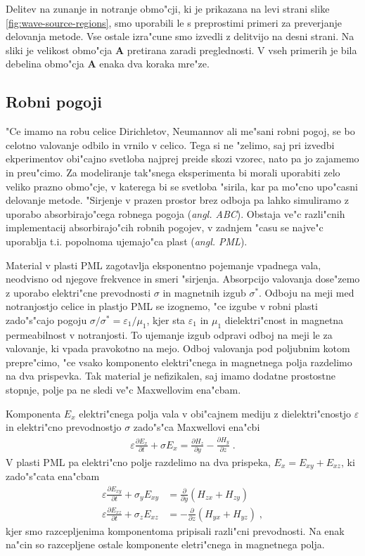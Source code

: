 \documentclass[a4paper,10pt]{article}
\newcommand{\odvod}[2]{\frac{\partial #1}{\partial #2}}
\newcommand{\eps}{\varepsilon}
\newcommand{\angl}[1]{(\textit{angl. #1})}
\begin{document}
Delitev na zunanje in notranje obmo"cji, ki je prikazana na levi strani slike \ref{fig:wave-source-regions}, smo uporabili le s preprostimi primeri za preverjanje delovanja metode. 
Vse ostale izra"cune smo izvedli z delitvijo na desni strani. 
Na sliki je velikost obmo"cja \textbf{A} pretirana zaradi preglednosti. 
V vseh primerih je bila debelina obmo"cja \textbf{A} enaka dva koraka mre"ze. 

\subsection{Robni pogoji}

"Ce imamo na robu celice Dirichletov, Neumannov ali me"sani robni pogoj, se bo celotno valovanje odbilo in vrnilo v celico. 
Tega si ne "zelimo, saj pri izvedbi ekperimentov obi"cajno svetloba najprej preide skozi vzorec, nato pa jo zajamemo in preu"cimo. 
Za modeliranje tak"snega eksperimenta bi morali uporabiti zelo veliko prazno obmo"cje, v katerega bi se svetloba "sirila, kar pa mo"cno upo"casni delovanje metode. 
"Sirjenje v prazen prostor brez odboja pa lahko simuliramo z uporabo absorbirajo"cega robnega pogoja \angl{\ac{ABC}}. 
Obstaja ve"c razli"cnih implementacij absorbirajo"cih robnih pogojev, v zadnjem "casu se najve"c uporablja t.i. popolnoma ujemajo"ca plast \angl{\ac{PML}}\cite{taflove,berenger}. 

Material v plasti \acs{PML} zagotavlja eksponentno pojemanje vpadnega vala, neodvisno od njegove frekvence in smeri "sirjenja. 
Absorpcijo valovanja dose"zemo z uporabo elektri"cne prevodnosti $\sigma$ in magnetnih izgub $\sigma^*$. 
Odboju na meji med notranjostjo celice in plastjo \acs{PML} se izognemo, "ce izgube v robni plasti zado"s"cajo pogoju $\sigma/\sigma^* = \eps_1/\mu_1$, kjer sta $\eps_1$ in $\mu_1$ dielektri"cnost in magnetna permeabilnost v notranjosti. 
To ujemanje izgub odpravi odboj na meji le za valovanje, ki vpada pravokotno na mejo. 
Odboj valovanja pod poljubnim kotom prepre"cimo, "ce vsako komponento elektri"cnega in magnetnega polja razdelimo na dva prispevka. 
Tak material je nefizikalen, saj imamo dodatne prostostne stopnje, polje pa ne sledi ve"c Maxwellovim ena"cbam. 

Komponenta $E_x$ elektri"cnega polja vala v obi"cajnem mediju z dielektri"cnostjo $\eps$ in elektri"cno prevodnostjo $\sigma$ zado"s"ca Maxwellovi ena"cbi
\begin{align}
 \eps \odvod{E_x}{t} + \sigma E_x = \odvod{H_z}{y} - \odvod{H_y}{z}\;.
\end{align}
V plasti \acs{PML} pa elektri"cno polje razdelimo na dva prispeka, $E_x = E_{xy} + E_{xz}$, ki zado"s"cata ena"cbam
\begin{align}
 \eps \odvod{E_{xy}}{t} + \sigma_y E_{xy} &= \odvod{}{y}(H_{zx} + H_{zy}) \\
 \eps \odvod{E_{xz}}{t} + \sigma_z E_{xz} &= -\odvod{}{z}(H_{yx} + H_{yz})\;,
\end{align}
kjer smo razcepljenima komponentoma pripisali razli"cni prevodnosti. 
Na enak na"cin so razcepljene ostale komponente eletri"cnega in magnetnega polja. 
\end{document}
